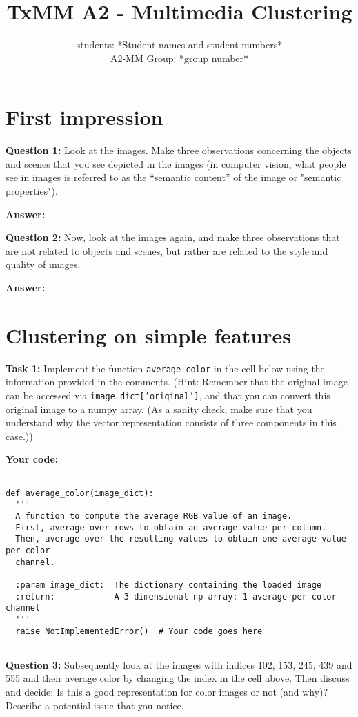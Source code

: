 \documentclass[11pt]{article}
\title{TxMM A2 - Multimedia Clustering}
\author{students: *Student names and student numbers* \\ A2-MM Group: *group number*}
\date{}
\begin{document}
\maketitle

\section{First impression}

\textbf{Question 1:} Look at the images. Make three observations concerning the objects and scenes that you see depicted in the images (in computer vision, what people see in images is referred to as the “semantic content” of the image or "semantic properties").

\textbf{Answer:}


\noindent\textbf{Question 2:} Now, look at the images again, and make three observations that are not related to objects and scenes, but rather are related to the style and quality of images.

\textbf{Answer:}


\section{Clustering on simple features}

\textbf{Task 1:}  Implement the function \texttt{average\_color} in the cell below using the information provided in the comments. (Hint: Remember that the original image can be accessed via \texttt{image\_dict['original']}, and that you can convert this original image to a numpy array. (As a sanity check, make sure that you understand why the vector representation consists of three components in this case.))

\textbf{Your code:}

\begin{lstlisting}

def average_color(image_dict):
  '''
  A function to compute the average RGB value of an image.
  First, average over rows to obtain an average value per column.
  Then, average over the resulting values to obtain one average value per color
  channel.

  :param image_dict:  The dictionary containing the loaded image
  :return:            A 3-dimensional np array: 1 average per color channel
  '''
  raise NotImplementedError()  # Your code goes here
  
\end{lstlisting}


\noindent\textbf{Question 3:} Subsequently look at the images with indices 102, 153, 245, 439 and 555 and their average color by changing the index in the cell above. Then discuss and decide: Is this a good representation for color images or not (and why)? Describe a potential issue that you notice.
\end{document}
